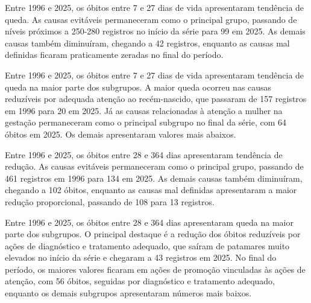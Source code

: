 
Entre 1996 e 2025, os óbitos entre 7 e 27 dias de vida apresentaram tendência de queda. As causas evitáveis permaneceram como o principal grupo, passando de níveis próximos a 250-280 registros no início da série para 99 em 2025. As demais causas também diminuíram, chegando a 42 registros, enquanto as causas mal definidas ficaram praticamente zeradas no final do período.


Entre 1996 e 2025, os óbitos entre 7 e 27 dias de vida apresentaram tendência de queda na maior parte dos subgrupos.  A maior queda ocorreu nas causas reduzíveis por adequada atenção ao recém-nascido, que passaram de 157 registros em 1996 para 20 em 2025. Já as causas relacionadas à atenção a mulher na gestação permaneceram como o principal subgrupo no final da série, com 64 óbitos em 2025. Os demais apresentaram valores mais abaixos.


Entre 1996 e 2025, os óbitos entre 28 e 364 dias apresentaram tendência de redução. As causas evitáveis permaneceram como o principal grupo, passando de 461 registros em 1996 para 134 em 2025. As demais causas também diminuíram, chegando a 102 óbitos, enquanto as causas mal definidas apresentaram a maior redução proporcional, passando de 108 para 13 registros.


Entre 1996 e 2025, os óbitos entre 28 e 364 dias apresentaram queda na maior parte dos subgrupos. O principal destaque é a redução dos óbitos reduzíveis por ações de diagnóstico e tratamento adequado, que saíram de patamares muito elevados no início da série e chegaram a 43 registros em 2025. No final do período, os maiores valores ficaram em ações de promoção vinculadas às ações de atenção, com 56 óbitos, seguidas por diagnóstico e tratamento adequado, enquanto os demais subgrupos apresentaram números mais baixos.

